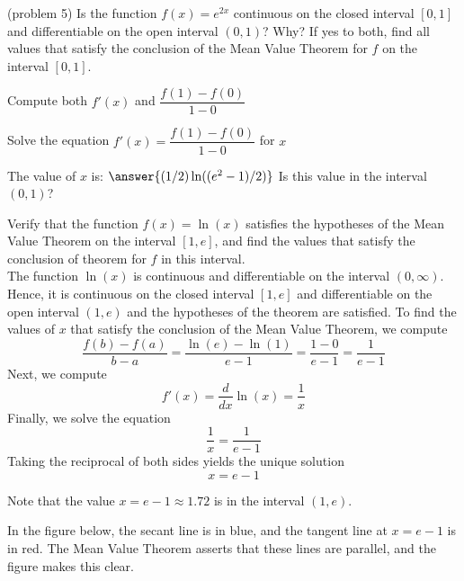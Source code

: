 \documentclass[handout]{ximera}
\begin{document}
\begin{problem}(problem 5)
  Is the function $f(x) = e^{2x}$ continuous on the closed interval $[0,1]$ and differentiable on the open interval $(0,1)$? Why?
  If yes to both, find all values that satisfy the conclusion of the Mean Value Theorem for $f$ on the interval $[0,1]$.

    \begin{hint}
      Compute both $f'(x)$ and $\dfrac{f(1) - f(0)}{1-0}$
    \end{hint}
		\begin{hint}
		  Solve the equation $f'(x) = \dfrac{f(1) - f(0)}{1-0}$ for $x$
		\end{hint}
		
		The value of $x$ is:
		 $\answer{(1/2) \ln((e^2 -1)/2)}$
		 Is this value in the interval $(0,1)$?
\end{problem}


\begin{example}[example 6]
Verify that the function $f(x) = \ln(x)$ satisfies the hypotheses of the Mean Value Theorem
on the interval $[1,e]$, and find the values that satisfy the conclusion of theorem for $f$ in this interval.\\
The function $\ln(x)$ is continuous and differentiable on the interval $(0, \infty)$. 
Hence, it is continuous on the closed interval $[1, e]$ and differentiable on the open interval $(1, e)$ and the hypotheses of the theorem are satisfied.
To find the values of $x$ that satisfy the conclusion of the Mean Value Theorem, we compute
\[
\frac{f(b) - f(a)}{b-a} = \frac{\ln(e) - \ln(1)}{e-1} = \frac{1 - 0}{e-1} = \frac{1}{e-1}
\]
Next, we compute
\[f'(x) = \frac{d}{dx} \ln(x) = \frac{1}{x}\]
Finally, we solve the equation
\[\frac{1}{x} = \frac{1}{e-1}\]
Taking the reciprocal of both sides yields the unique solution
\[ x = e-1\]

Note that the value $x = e-1\approx 1.72$ is in the interval $(1,e)$.

In the figure below, the secant line is in blue, 
and the tangent line at $x = e-1$ is in red. 
The Mean Value Theorem asserts that these lines are parallel, and the figure
makes this clear.

\begin{image}
\end{image}


\end{example}
\end{document}
